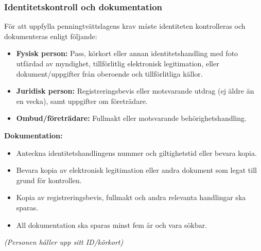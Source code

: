 \documentclass[10pt]{beamer}
\begin{document}
\begin{frame}[label=identitetskontroll]
  \frametitle{Identitetskontroll och dokumentation}

  \small
  För att uppfylla penningtvättslagens krav måste identiteten kontrolleras och dokumenteras enligt följande:
  \begin{itemize}
    \item \textbf{Fysisk person:} Pass, körkort eller annan identitetshandling med foto utfärdad av myndighet, tillförlitlig elektronisk legitimation, eller dokument/uppgifter från oberoende och tillförlitliga källor.
    \item \textbf{Juridisk person:} Registreringsbevis eller motsvarande utdrag (ej äldre än en vecka), samt uppgifter om företrädare.
    \item \textbf{Ombud/företrädare:} Fullmakt eller motsvarande behörighetshandling.
  \end{itemize}

  \vspace{0.5cm}
  \textbf{Dokumentation:}
  \begin{itemize}
    \item Anteckna identitetshandlingens nummer och giltighetstid eller bevara kopia.
    \item Bevara kopia av elektronisk legitimation eller andra dokument som legat till grund för kontrollen.
    \item Kopia av registreringsbevis, fullmakt och andra relevanta handlingar ska sparas.
    \item All dokumentation ska sparas minst fem år och vara sökbar.
  \end{itemize}

  \vspace{0.8cm}
  \begin{minipage}{0.45\textwidth}
    \begin{flushleft}
      \footnotesize
      	\textit{(Personen håller upp sitt ID/körkort)}
    \end{flushleft}
  \end{minipage}%
  \hfill
  \begin{minipage}{0.45\textwidth}
    \begin{flushright}
      \hyperlink{nextslide}{}
    \end{flushright}
  \end{minipage}
\end{frame}
\end{document}
